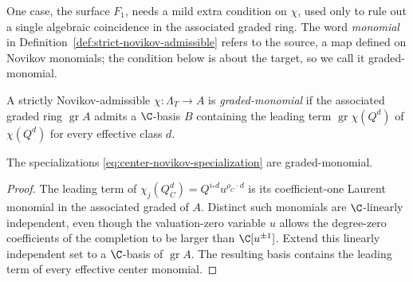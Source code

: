 One case, the surface \(F_1\), needs a mild extra condition on \(\chi\), used
only to rule out a single algebraic coincidence in the associated graded ring.
The word \emph{monomial} in Definition~\ref{def:strict-novikov-admissible} refers
to the source, a map defined on Novikov monomials; the condition below is about
the target, so we call it graded-monomial.

\begin{definition}
\label{def:monomial-specialization}
%
%
A strictly Novikov-admissible \(\chi:\Lambda_T\to A\) is \emph{graded-monomial} if the
associated graded ring \(\operatorname{gr}A\) admits a \(\C\)-basis \(B\)
containing the leading term \(\operatorname{gr}\chi(Q^d)\) of \(\chi(Q^d)\) for
every effective class \(d\).
\end{definition}

\begin{lemma}
\label{lem:center-maps-monomial}
%
%
The specializations \eqref{eq:center-novikov-specialization} are graded-monomial.
\end{lemma}

\begin{proof}
The leading term of
\(\chi_j(Q_C^d)=Q^{i_*d}u^{\rho_C\cdot d}\) is its coefficient-one Laurent
monomial in the associated graded of \(A\).  Distinct such monomials are
\(\C\)-linearly independent, even though the valuation-zero variable \(u\)
allows the degree-zero coefficients of the completion to be larger than
\(\C[u^{\pm1}]\).  Extend this linearly independent set to a
\(\C\)-basis of \(\operatorname{gr}A\).  The resulting basis contains the
leading term of every effective center monomial.
\end{proof}

